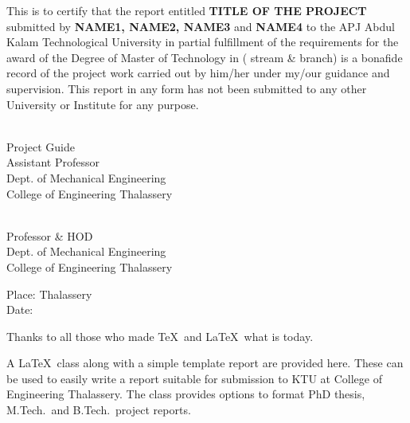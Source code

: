 \documentclass[BTech]{cetlyproj}
\begin{document}
\noindent This is to certify that the report entitled {\large \bf TITLE OF THE PROJECT} submitted by {\bf NAME1, NAME2, NAME3} and {\bf NAME4} to the APJ Abdul Kalam Technological University in partial fulfillment of the requirements for the award of the Degree of Master of Technology in ( stream \& branch) is a bonafide record of the project work carried out by him/her under my/our guidance and supervision. This report in any form has not been submitted to any
other University or Institute for any purpose.

\vspace*{1.0in}

\begin{singlespacing}
\hspace*{-0.25in}
\parbox{2.5in}{
 \\
\noindent Project Guide \\ 
\noindent Assistant Professor \\
\noindent Dept. of Mechanical Engineering\\
\noindent College of Engineering Thalassery \\
} 
\hspace*{1.0in} 
\parbox{2.5in}{
 \\
\noindent Professor \& HOD \\ 
\noindent Dept. of Mechanical Engineering\\
\noindent College of Engineering Thalassery \\
}  
\end{singlespacing}
\vspace*{0.25in}

\noindent Place: Thalassery\\
Date: 


\acknowledgements

Thanks to all those who made \TeX\ and \LaTeX\ what is today.


\abstract


\vspace*{24pt}

\noindent A \LaTeX\ class along with a simple template report are
provided here.  These can be used to easily write a report suitable
for submission to KTU at College of Engineering Thalassery.  The class provides options to format PhD thesis, M.Tech.\ and B.Tech.\ project reports. 
\end{document}

